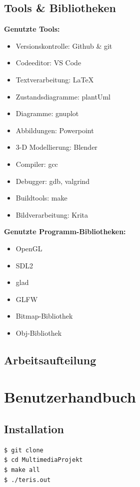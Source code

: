 \documentclass[11pt]{article}
\begin{document}
\subsection{Tools \& Bibliotheken}

\textbf{Genutzte Tools:}
\begin{itemize}
  \item Versionskontrolle: Github \& git
  \item Codeeditor: VS Code
  \item Textverarbeitung: \LaTeX
  \item Zustandsdiagramme: plantUml
  \item Diagramme: gnuplot
  \item Abbildungen: Powerpoint
  \item 3-D Modellierung: Blender
  \item Compiler: gcc
  \item Debugger: gdb, valgrind
  \item Buildtools: make
  \item Bildverarbeitung: Krita
\end{itemize}

\noindent \textbf{Genutzte Programm-Bibliotheken:}
\begin{itemize}
  \item OpenGL
  \item SDL2
  \item glad
  \item GLFW
  \item Bitmap-Bibliothek
  \item Obj-Bibliothek
\end{itemize}

\subsection{Arbeitsaufteilung}

\pagebreak

\section{Benutzerhandbuch}

\subsection{Installation}

\begin{lstlisting}[language=bash]
$ git clone 
$ cd MultimediaProjekt
$ make all
$ ./teris.out
\end{lstlisting}
\end{document}
